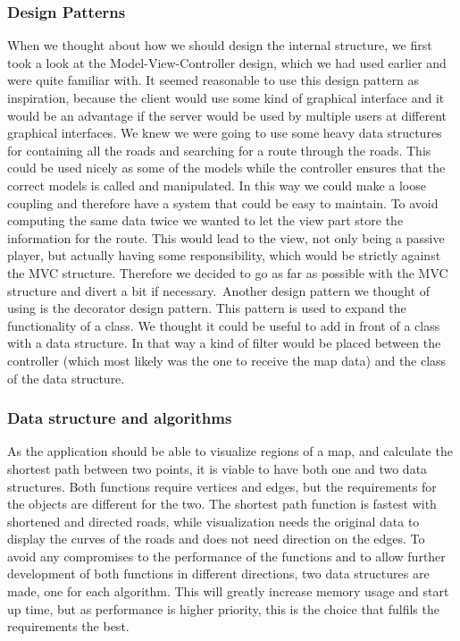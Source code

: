 \documentclass[a4paper,10pt,titlepage]{article}
\begin{document}
			\subsubsection{Design Patterns}
			When we thought about how we should design the internal structure, we first took a look at the Model-View-Controller design, which we had used earlier and were quite familiar with. It seemed reasonable to use this design pattern as inspiration, because the client would use some kind of graphical interface and it would be an advantage if the server would be used by multiple users at different graphical interfaces. We knew we were going to use some heavy data structures for containing all the roads and searching for a route through the roads. This could be used nicely as some of the models while the controller ensures that the correct models is called and manipulated. In this way we could make a loose coupling and therefore have a system that could be easy to maintain.
To avoid computing the same data twice we wanted to let the view part store the information for the route. This would lead to the view, not only being a passive player, but actually having some responsibility, which would be strictly against the MVC structure. Therefore we decided to go as far as possible with the MVC structure and divert a bit if necessary.\
Another design pattern we thought of using is the decorator design pattern. This pattern is used to expand the functionality of a class. We thought it could be useful to add in front of a class with a data structure. In that way a kind of filter would be placed between the controller (which most likely was the one to receive the map data) and the class of the data structure.


			\subsubsection{Data structure and algorithms}
			As the application should be able to visualize regions of a map, and calculate the shortest path between two points, it is viable to have both one and two data structures. Both functions require vertices and edges, but the requirements for the objects are different for the two. The shortest path function is fastest with shortened and directed roads, while visualization needs the original data to display the curves of the roads and does not need direction on the edges. To avoid any compromises to the performance of the functions and to allow further development of both functions in different directions, two data structures are made, one for each algorithm. This will greatly increase memory usage and start up time, but as performance is higher priority, this is the choice that fulfils the requirements the best.
\end{document}
